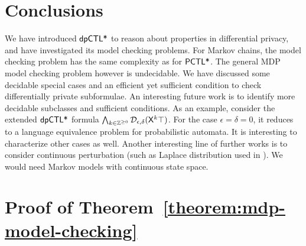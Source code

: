 \documentclass{llncs}
\begin{document}
%

\section{Conclusions}
\label{section:conclusions}
We have introduced $\textsf{dpCTL*}$ to reason about properties in differential privacy, and have investigated its model checking problems. For Markov chains, the model checking problem has the same complexity as for $\textsf{PCTL*}$. The general MDP model checking problem however is undecidable. 
We have discussed some decidable special cases and an efficient yet sufficient condition to check differentially private subformulae.
An interesting future work is to identify more
decidable subclasses and sufficient conditions.
As an example, consider the extended $\textsf{dpCTL*}$ formula $\bigwedge_{k \in \mathbb{Z}^{\geq 0}}
\mathcal{D}_{{\epsilon}, {\delta}} (\mathsf{X}^k  \top)$. For the case $\epsilon=\delta=0$, it reduces to a language equivalence problem for probabilistic automata. It is interesting to characterize other cases as well.
Another interesting line of further works is to consider continuous perturbation (such as Laplace distribution used in \cite{DR:14:AFDP}). We would need Markov models with continuous state space.





\newpage
\appendix

\section{Proof of Theorem~\ref{theorem:mdp-model-checking}}

\end{document}
